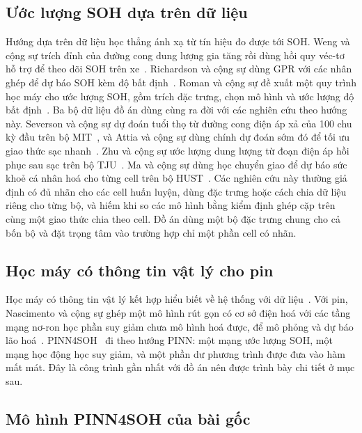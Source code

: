 \subsection{Ước lượng SOH dựa trên dữ liệu}

Hướng dựa trên dữ liệu học thẳng ánh xạ từ tín hiệu đo được tới SOH. Weng và cộng sự trích đỉnh của đường cong dung
lượng gia tăng rồi dùng hồi quy véc-tơ hỗ trợ để theo dõi SOH trên xe~\cite{weng2013}. Richardson và cộng sự dùng GPR với
các nhân ghép để dự báo SOH kèm độ bất định~\cite{richardson2017}. Roman và cộng sự đề xuất một quy trình học máy cho ước
lượng SOH, gồm trích đặc trưng, chọn mô hình và ước lượng độ bất định~\cite{roman2021}.
Ba bộ dữ liệu đồ án dùng cùng ra đời với các nghiên cứu theo hướng này. Severson và cộng sự dự đoán tuổi thọ từ đường
cong điện áp xả của 100 chu kỳ đầu trên bộ MIT~\cite{severson2019}, và Attia và cộng sự dùng chính dự đoán sớm đó để tối
ưu giao thức sạc nhanh~\cite{attia2020}. Zhu và cộng sự ước lượng dung lượng từ đoạn điện áp hồi phục sau sạc trên bộ
TJU~\cite{zhu2022}. Ma và cộng sự dùng học chuyển giao để dự báo sức khoẻ cá nhân hoá cho từng cell trên bộ
HUST~\cite{ma2022}. Các nghiên cứu này thường giả định có đủ nhãn cho các cell huấn luyện, dùng đặc trưng hoặc cách chia
dữ liệu riêng cho từng bộ, và hiếm khi so các mô hình bằng kiểm định ghép cặp trên cùng một giao thức chia theo cell. Đồ
án dùng một bộ đặc trưng chung cho cả bốn bộ và đặt trọng tâm vào trường hợp chỉ một phần cell có nhãn.

\subsection{Học máy có thông tin vật lý cho pin}

Học máy có thông tin vật lý kết hợp hiểu biết về hệ thống với dữ liệu~\cite{karniadakis2021}. Với pin, Nascimento và cộng
sự ghép một mô hình rút gọn có cơ sở điện hoá với các tầng mạng nơ-ron học phần suy giảm chưa mô hình hoá được, để mô phỏng
và dự báo lão hoá~\cite{nascimento2021}. PINN4SOH~\cite{wang2024} đi theo hướng PINN: một mạng ước lượng SOH, một mạng học
động học suy giảm, và một phần dư phương trình được đưa vào hàm mất mát. Đây là công trình gần nhất với đồ án nên được
trình bày chi tiết ở mục sau.

\subsection{Mô hình PINN4SOH của bài gốc}\label{sec:lt_pinn4soh}

